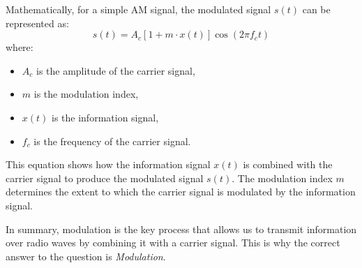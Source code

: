 Mathematically, for a simple AM signal, the modulated signal \( s(t) \) can be represented as:
\[
s(t) = A_c \left[1 + m \cdot x(t)\right] \cos(2\pi f_c t)
\]
where:
\begin{itemize}
    \item \( A_c \) is the amplitude of the carrier signal,
    \item \( m \) is the modulation index,
    \item \( x(t) \) is the information signal,
    \item \( f_c \) is the frequency of the carrier signal.
\end{itemize}

This equation shows how the information signal \( x(t) \) is combined with the carrier signal to produce the modulated signal \( s(t) \). The modulation index \( m \) determines the extent to which the carrier signal is modulated by the information signal.

In summary, modulation is the key process that allows us to transmit information over radio waves by combining it with a carrier signal. This is why the correct answer to the question is \textit{Modulation}.

